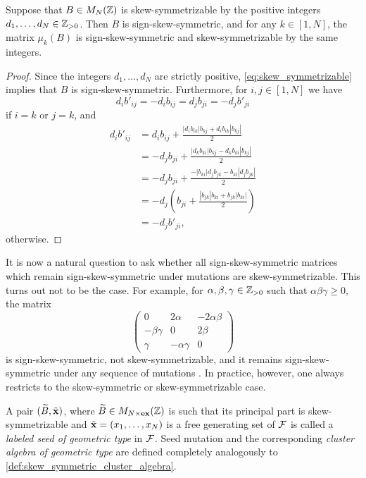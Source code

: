 \begin{proposition}\label{prop:mutation_preserves_skew_symmetrizable}
	Suppose that $B \in M_N(\mathbb{Z})$ is skew-symmetrizable by the positive integers $d_1, \dots, d_N \in \mathbb{Z}_{>0}$. Then $B$ is sign-skew-symmetric, and for any $k \in [1, N]$, the matrix $\mu_k(B)$ is sign-skew-symmetric and skew-symmetrizable by the same integers.
\end{proposition}
\begin{proof}
	Since the integers $d_1, \dots, d_N$ are strictly positive, \cref{eq:skew_symmetrizable} implies that $B$ is sign-skew-symmetric. Furthermore, for $i,j \in [1, N]$ we have
	\begin{equation*}
		d_i b'_{ij} = - d_i  b_{ij} = d_j b_{ji} = -d_j b'_{ji}
	\end{equation*}
	if $i =k$ or $j = k$, and
	\begin{align*}
		d_i b'_{ij}
		 & = d_i b_{ij} + \frac{|d_i b_{ik}|b_{kj} + d_i b_{ik}|b_{kj}|}{2}         \\
		 & = - d_j b_{ji} + \frac{|d_k b_{ki}|b_{kj} - d_k b_{ki}|b_{kj}|}{2}       \\
		 & = - d_j b_{ji} + \frac{ - |b_{ki}| d_j b_{jk} - b_{ki}|d_jb_{jk}|}{2}    \\
		 & = - d_j\left( b_{ji} + \frac{|b_{jk}|b_{ki} +  b_{jk}|b_{ki}|}{2}\right) \\
		 & = - d_jb'_{ji},
	\end{align*}
	otherwise.
\end{proof}

It is now a natural question to ask whether all sign-skew-symmetric matrices which
remain sign-skew-symmetric under mutations are skew-symmetrizable. This turns out not
to be the case. For example, for $\alpha, \beta, \gamma \in \mathbb{Z}_{>0}$ such that
$\alpha\beta\gamma \geq 0$, the matrix
\begin{equation*}
	\begin{pmatrix}
		0             & 2\alpha         & -2\alpha \beta \\
		-\beta \gamma & 0               & 2 \beta        \\
		\gamma        & - \alpha \gamma & 0
	\end{pmatrix}
\end{equation*}
%
is sign-skew-symmetric, not skew-symmetrizable, and it remains sign-skew-symmetric
under any sequence of mutations \parencite[Proposition 4.7]{FominZelevinsky2002CAF}. In practice, however, one always
restricts to the skew-symmetric or skew-symmetrizable case.
\begin{definition}\label{def:cluster_algebra_geometric_type}

	A pair $(\widetilde{B}, \tilde{\mathbf{x}})$, where $\widetilde{B} \in M_{N \times \mathbf{ex}}(\mathbb{Z})$ is such that its principal
	part is skew-symmetrizable and $\tilde{\mathbf{x}} = (x_1, \dots, x_N)$ is a free generating set of
	$\mathcal{F}$ is called a \emph{labeled seed of geometric type}
	in $\mathcal{F}$. Seed mutation and the corresponding \emph{cluster algebra of geometric
		type} are defined completely analogously to
	\cref{def:skew_symmetric_cluster_algebra}.
\end{definition}

